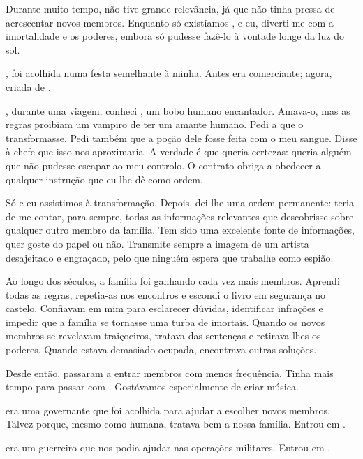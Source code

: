 {Durante muito tempo, não tive grande relevância, já que  não tinha pressa de acrescentar novos membros. Enquanto só existíamos ,  e eu, diverti-me com a imortalidade e os poderes, embora só pudesse fazê-lo à vontade longe da luz do sol.

,  foi acolhida numa festa semelhante à minha. Antes era comerciante; agora, criada de .

, durante uma viagem, conheci , um bobo humano encantador. Amava-o, mas as regras proibiam um vampiro de ter um amante humano. Pedi a  que o transformasse. Pedi também que a poção dele fosse feita com o meu sangue. Disse à chefe que isso nos aproximaria. A verdade é que queria certezas: queria alguém que não pudesse escapar ao meu controlo. O contrato obriga  a obedecer a qualquer instrução que eu lhe dê como ordem.

Só  e eu assistimos à transformação. Depois, dei-lhe uma ordem permanente: teria de me contar, para sempre, todas as informações relevantes que descobrisse sobre qualquer outro membro da família. Tem sido uma excelente fonte de informações, quer goste do papel ou não. Transmite sempre a imagem de um artista desajeitado e engraçado, pelo que ninguém espera que trabalhe como espião.

Ao longo dos séculos, a família foi ganhando cada vez mais membros. Aprendi todas as regras, repetia-as nos encontros e escondi o livro em segurança no castelo. Confiavam em mim para esclarecer dúvidas, identificar infrações e impedir que a família se tornasse uma turba de imortais. Quando os novos membros se revelavam traiçoeiros, tratava das sentenças e retirava-lhes os poderes. Quando estava demasiado ocupada,  encontrava outras soluções.

Desde então, passaram a entrar membros com menos frequência. Tinha mais tempo para passar com . Gostávamos especialmente de criar música.

 era uma governante que foi acolhida para ajudar a escolher novos membros. Talvez porque, mesmo como humana, tratava bem a nossa família. Entrou em .

 era um guerreiro que nos podia ajudar nas operações militares. Entrou em .

}
